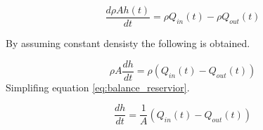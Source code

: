 \begin{equation}
		\frac{d\rho Ah(t)}{dt}=\rho Q_{in}(t)-\rho Q_{out}(t)
\end{equation}

By assuming constant densisty the following is obtained.

\begin{equation}\label{eq:balance_reservior}
	\rho A\frac{dh}{dt}=\rho \left(Q_{in}(t)-Q_{out}(t)\right)
\end{equation}
Simplifing equation \ref{eq:balance_reservior}.

\begin{equation}
	\frac{dh}{dt}=\frac{1}{A} \left(Q_{in}(t)-Q_{out}(t)\right)
\end{equation}


